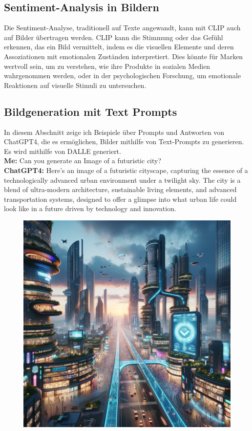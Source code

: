 \documentclass[nolibertine, ngerman, algorithm, nomencl, minted]{ttlab-qualify}
\begin{document}
\subsection{Sentiment-Analysis in Bildern}
Die Sentiment-Analyse, traditionell auf Texte angewandt, kann mit CLIP auch auf Bilder übertragen werden. 
CLIP kann die Stimmung oder das Gefühl erkennen, das ein Bild vermittelt, indem es die visuellen Elemente 
und deren Assoziationen mit emotionalen Zuständen interpretiert. Dies könnte für Marken wertvoll sein, um zu 
verstehen, wie ihre Produkte in sozialen Medien wahrgenommen werden, oder in der psychologischen Forschung, 
um emotionale Reaktionen auf visuelle Stimuli zu untersuchen.


\subsection{Bildgeneration mit Text Prompts}
In diesem Abschnitt zeige ich Beispiele über Prompts und Antworten von ChatGPT4, die es ermöglichen, Bilder mithilfe von Text-Prompts zu generieren. Es wird 
mithilfe von DALLE generiert.\\
\textbf{Me:} Can you generate an Image of a futuristic city?\\
\textbf{ChatGPT4:} Here's an image of a futuristic cityscape, capturing the essence of a 
technologically advanced urban environment under a twilight sky. The city is a blend of 
ultra-modern architecture, sustainable living elements, and advanced transportation systems, 
designed to offer a glimpse into what urban life could look like in a future driven by technology and innovation.
\begin{figure}[h!]
	\centering
	\includegraphics[scale=0.2]{static/fcity.png}
\end{figure}
\end{document}
